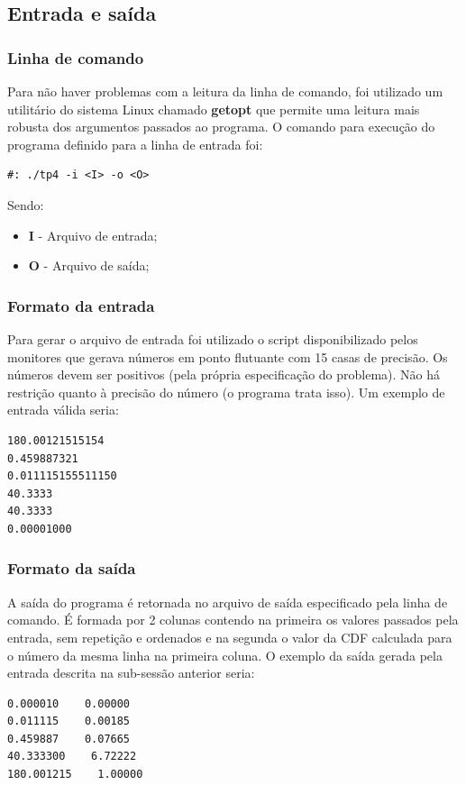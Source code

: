 \documentclass[12pt]{article}
\begin{document}
\subsection{Entrada e saída}
\subsubsection{Linha de comando}
Para não haver problemas com a leitura da linha de comando, foi utilizado um utilitário do
sistema Linux chamado \textbf{getopt} que permite uma leitura mais robusta dos argumentos
passados ao programa. O comando para execução do programa definido para a linha de entrada 
foi:
\begin{verbatim}
#: ./tp4 -i <I> -o <O>
\end{verbatim}
Sendo: 
\begin{itemize}
  \item \textbf{I} - Arquivo de entrada;
  \item \textbf{O} - Arquivo de saída;
\end{itemize}

\subsubsection{Formato da entrada}
Para gerar o arquivo de entrada foi utilizado o script disponibilizado pelos monitores que 
gerava números em ponto flutuante com 15 casas de precisão. Os números devem ser positivos 
(pela própria especificação do problema). Não há restrição quanto à  precisão do número (o 
programa trata isso). Um exemplo de entrada válida seria:
\begin{verbatim}
180.00121515154
0.459887321
0.011115155511150
40.3333
40.3333
0.00001000
\end{verbatim}

\subsubsection{Formato da saída}
A saída do programa é retornada no arquivo de saída especificado pela linha de comando.
É formada por 2 colunas contendo na primeira os valores passados pela entrada, sem repetição
e ordenados e na segunda o valor da CDF calculada para o número da mesma linha na primeira 
coluna. O exemplo da saída gerada pela entrada descrita na sub-sessão anterior seria:
\begin{verbatim}
0.000010    0.00000
0.011115    0.00185
0.459887    0.07665
40.333300    6.72222
180.001215    1.00000
\end{verbatim}
\end{document}

